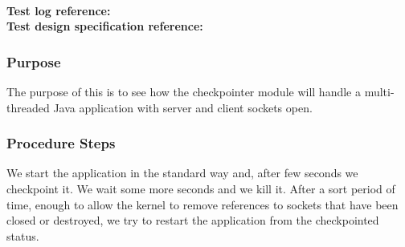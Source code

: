 


\\
\noindent\textbf{Test log reference: }\\ %
\noindent\textbf{Test design specification reference: } %




\subsubsection{Purpose}

The purpose of this is to see how the checkpointer module will handle a multi-threaded Java application with server and client sockets open.

\subsubsection{Procedure Steps}
We start the application in the standard way and, after few seconds we checkpoint it. We wait some more seconds and we kill it. After a sort period
of time, enough to allow the kernel to remove references to sockets that have been closed or destroyed, we try to restart the application
from the checkpointed status.


